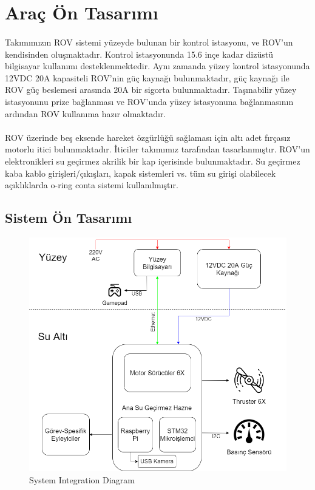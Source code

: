 \documentclass[12pt]{article}
\begin{document}
\newpage

\section{Araç Ön Tasarımı}


\paragraph{} Takımımızın ROV sistemi yüzeyde bulunan bir kontrol istasyonu, ve ROV'un kendisinden oluşmaktadır. Kontrol istasyonunda 15.6 inçe kadar dizüstü bilgisayar kullanımı desteklenmektedir. Aynı zamanda yüzey kontrol istasyonunda 12VDC 20A kapasiteli ROV'nin güç kaynağı bulunmaktadır, güç kaynağı ile ROV güç beslemesi arasında 20A bir sigorta bulunmaktadır. Taşınabilir yüzey istasyonunu prize bağlanması ve ROV'unda yüzey istasyonuna bağlanmasının ardından ROV kullanıma hazır olmaktadır.

\paragraph{} ROV üzerinde beş eksende hareket özgürlüğü sağlaması için altı adet fırçasız motorlu itici bulunmaktadır. İticiler takımımız tarafından tasarlanmıştır. ROV'un elektronikleri su geçirmez akrilik bir kap içerisinde bulunmaktadır. Su geçirmez kaba kablo girişleri/çıkışları, kapak sistemleri vs. tüm su girişi olabilecek açıklıklarda o-ring conta sistemi kullanılmıştır. 

\newpage
\subsection{Sistem Ön Tasarımı}

\begin{figure}[h]
\centering
\includegraphics[width=1\textwidth]{SID.png}
\caption{System Integration Diagram}
\end{figure}
\end{document}
